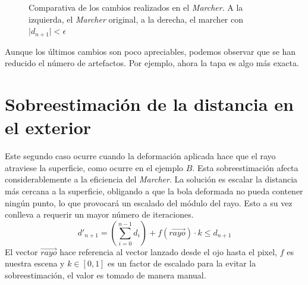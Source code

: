 \begin{figure}[H]
  \centering
  \captionsetup{justification=centering}%
  \hfill
  \caption{Comparativa de los cambios realizados en el \textit{Marcher}. A la izquierda, el \textit{Marcher} original, a la derecha, el marcher con \(\vert d_{n+1}\vert < \epsilon\)}
\end{figure}

Aunque los últimos cambios son poco apreciables, podemos observar que se han reducido el número de artefactos. Por ejemplo, ahora la tapa es algo más exacta. 

\section{Sobreestimación de la distancia en el exterior}
Este segundo caso ocurre cuando la deformación aplicada hace que el rayo atraviese la superficie, como ocurre en el ejemplo \textit{\(B\)}.
Esta sobreestimación afecta considerablemente a la eficiencia del \textit{Marcher}. La solución es escalar la distancia más cercana a la superficie, obligando a que la bola deformada no pueda contener ningún punto, lo que provocará un escalado del módulo del rayo. Esto a su vez conlleva a requerir un mayor número de iteraciones.
\[d'_{n+1}=\left(\sum^{n-1}_{i=0} d_{i}\right) + f(\Vec{rayo})\cdot k \leq d_{n+1}\]
El vector \(\Vec{rayo}\) hace referencia al vector lanzado desde el ojo hasta el pixel, \(f\) es nuestra escena y \(k\in[0,1]\) es un factor de escalado para la evitar la sobreestimación, el valor es tomado de manera manual.

